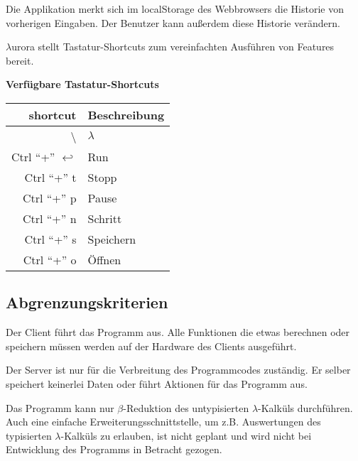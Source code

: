 \documentclass[parskip=full,11pt,twoside]{scrartcl}
\begin{document}
Die Applikation merkt sich im localStorage des Webbrowsers die Historie von vorherigen Eingaben. Der Benutzer kann außerdem diese Historie verändern.

$\lambda$urora stellt Tastatur-Shortcuts zum vereinfachten Ausführen von Features bereit.

\textbf{Verfügbare Tastatur-Shortcuts}

\label{shortcuts}
\begin{tabular}{|r|l|}

    \hline
    shortcut & Beschreibung \\ \hline
    \textbackslash & $\lambda$ \\ \hline
    Ctrl \enquote{+} $\hookleftarrow$ & Run \\ \hline
    Ctrl \enquote{+} t & Stopp \\ \hline
    Ctrl \enquote{+} p & Pause \\ \hline
    Ctrl \enquote{+} n & Schritt \\ \hline
    Ctrl \enquote{+} s & Speichern \\ \hline
    Ctrl \enquote{+} o & Öffnen \\ \hline

\end{tabular}



\subsection{Abgrenzungskriterien}

Der Client führt das Programm aus. Alle Funktionen die etwas berechnen oder speichern müssen werden auf der Hardware des Clients ausgeführt.

Der Server ist nur für die Verbreitung des Programmcodes zuständig. Er selber speichert keinerlei Daten oder führt Aktionen für das Programm aus.

Das Programm kann nur $\beta$-Reduktion des untypisierten $\lambda$-Kalküls durchführen. Auch eine einfache Erweiterungsschnittstelle, um z.B. Auswertungen des typisierten $\lambda$-Kalküls zu erlauben, ist nicht geplant und wird nicht bei Entwicklung des Programms in Betracht gezogen.
\end{document}

